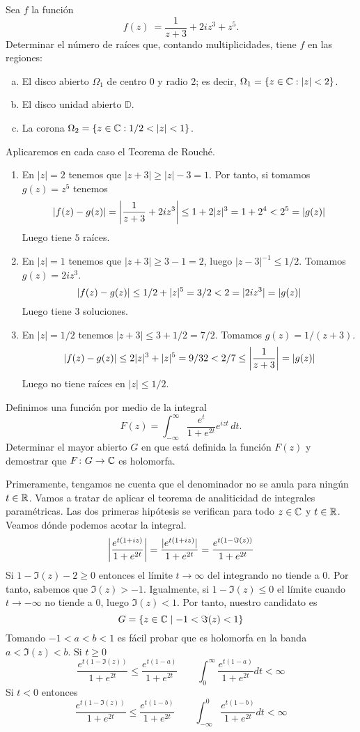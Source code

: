 \documentclass[twoside]{article}
\begin{document}
\newpage
\begin{ejercicio}{4}
Sea $f$ la función
\[ f(z)\ =\frac{1}{z + 3}+2iz^3+z^5.\]
Determinar el número de raíces que,
contando multiplicidades, tiene $f$ en las regiones:
\begin{enumerate}[a)]
\item El disco abierto $\Omega_1$ de centro 0 y radio 2; es decir, $\Omega_1=\{z\in\mathbb{C} : |z| < 2\}$.
\item El disco unidad abierto $\mathbb{D}$. 
\item La corona $\Omega_2=\{z\in\mathbb{C} : 1/2 < |z| < 1\}$.
\end{enumerate}
\end{ejercicio}
\begin{solucion}
Aplicaremos en cada caso el Teorema de Rouché.
\begin{enumerate}
\item En $|z|=2$ tenemos que $|z+3|\geq |z|-3 = 1$. Por tanto, si tomamos $g(z)=z^5$ tenemos
$$
|f(z)-g(z)| = \left\lvert\frac{1}{z+3}+2iz^3\right\rvert \leq 1 + 2|z|^3 = 1+2^4 < 2^5 = |g(z)|
$$
Luego tiene $5$ raíces.
\item En $|z|=1$ tenemos que $|z+3| \geq 3-1 = 2$, luego $|z-3|^{-1}\leq 1/2$. Tomamos $g(z)=2iz^3$.
$$
\left\lvert f(z)-g(z)\right\rvert \leq 1/2+|z|^5 = 3/2 < 2 = |2iz^3|  = |g(z)|
$$
Luego tiene 3 soluciones. 
\item En $|z|=1/2$ tenemos $|z+3| \leq 3+1/2 = 7/2 $.  Tomamos $g(z)=1/(z+3)$.
$$
\left\lvert f(z)-g(z)\right\rvert \leq 2|z|^3+|z|^5 = 9/32 < 2/7 \leq \left\lvert\frac{1}{z+3}\right\rvert = |g(z)|
$$
Luego no tiene raíces en $|z|\leq 1/2$.
\end{enumerate}
\end{solucion}

\newpage
\begin{ejercicio}{5}
Definimos una función por medio de la integral
\[F(z)=\int_{-\infty}^\infty \frac{e^t}{1+e^{2t}}e^{izt}\,dt.\]
Determinar el mayor abierto $G$ en que está definida la función $F(z)$ y demostrar que $F\colon G\to \mathbb{C}$ es holomorfa. 
\end{ejercicio}
\begin{solucion}
Primeramente, tengamos ne cuenta que el denominador no se anula para ningún $t\in \mathbb{R}$. Vamos a tratar de aplicar el teorema de analiticidad de integrales paramétricas. Las dos primeras hipótesis se verifican para todo $z\in \mathbb{C}$ y $t\in \mathbb{R}$. Veamos dónde podemos acotar la integral.
$$
\left\lvert\frac{e^{t(1+iz)}}{1+e^{2t}}\right\rvert = \frac{|e^{t(1+iz)}|}{1+e^{2t}} = \frac{e^{t(1-\Im(z))}}{1+e^{2t}}
$$
Si $1-\Im(z)-2\geq 0$ entonces el límite $t\to\infty$ del integrando no tiende a $0$. Por tanto, sabemos que $\Im(z)>-1$. Igualmente, si $1-\Im(z)\leq0$ el límite cuando $t\to-\infty$ no tiende a $0$, luego $\Im(z)<1$. Por tanto, nuestro candidato es
$$
G = \{z \in \mathbb{C} \mid -1 < \Im(z)<1\}
$$
Tomando $-1<a<b<1$ es fácil probar que es holomorfa en la banda $a<\Im(z)<b$. Si $t\geq 0$
$$
 \frac{e^{t(1-\Im(z))}}{1+e^{2t}} \leq \frac{e^{t(1-a)}}{1+e^{2t}} \qquad \int_0^\infty \frac{e^{t(1-a)}}{1+e^{2t}} dt < \infty 
$$
Si $t<0$ entonces
$$
 \frac{e^{t(1-\Im(z))}}{1+e^{2t}} \leq \frac{e^{t(1-b)}}{1+e^{2t}} \qquad \int_{-\infty}^0 \frac{e^{t(1-b)}}{1+e^{2t}} dt < \infty
$$
\end{solucion}
\end{document}
